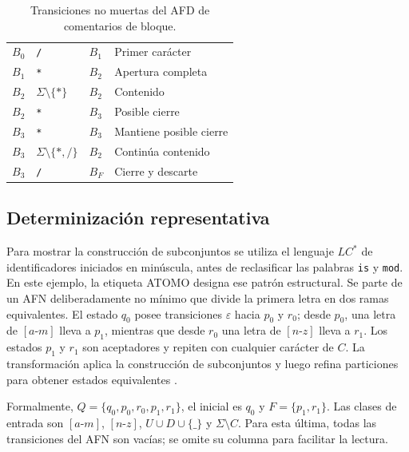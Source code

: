 \begin{table}[H]
\centering
\small
\caption{Transiciones no muertas del AFD de comentarios de bloque.}
\label{tab:afd-bloque}
\begin{tabularx}{\textwidth}{C{1.5cm}Y C{1.5cm} L{4.0cm}}
\toprule
{} &  &  &  \\
\midrule
$B_0$ & \texttt{/} & $B_1$ & Primer carácter \\
 $B_1$ & \texttt{*} & $B_2$ & Apertura completa \\
$B_2$ & $\Sigma\setminus\{\texttt{*}\}$ & $B_2$ & Contenido \\
 $B_2$ & \texttt{*} & $B_3$ & Posible cierre \\
$B_3$ & \texttt{*} & $B_3$ & Mantiene posible cierre \\
 $B_3$ & $\Sigma\setminus\{\texttt{*},\texttt{/}\}$ & $B_2$ & Continúa contenido \\
$B_3$ & \texttt{/} & $B_F$ & Cierre y descarte \\
\bottomrule
\end{tabularx}
\end{table}

\subsection{Determinización representativa}

Para mostrar la construcción de subconjuntos se utiliza el lenguaje $LC^*$ de identificadores iniciados en minúscula, antes de reclasificar las palabras \texttt{is} y \texttt{mod}. En este ejemplo, la etiqueta ATOMO designa ese patrón estructural. Se parte de un AFN deliberadamente no mínimo que divide la primera letra en dos ramas equivalentes. El estado $q_0$ posee transiciones $\varepsilon$ hacia $p_0$ y $r_0$; desde $p_0$, una letra de $[a\text{-}m]$ lleva a $p_1$, mientras que desde $r_0$ una letra de $[n\text{-}z]$ lleva a $r_1$. Los estados $p_1$ y $r_1$ son aceptadores y repiten con cualquier carácter de $C$. La transformación aplica la construcción de subconjuntos y luego refina particiones para obtener estados equivalentes \cite{hopcroft}.

Formalmente, $Q=\{q_0,p_0,r_0,p_1,r_1\}$, el inicial es $q_0$ y $F=\{p_1,r_1\}$. Las clases de entrada son $[a\text{-}m]$, $[n\text{-}z]$, $U\cup D\cup\{\_\}$ y $\Sigma\setminus C$. Para esta última, todas las transiciones del AFN son vacías; se omite su columna para facilitar la lectura.

